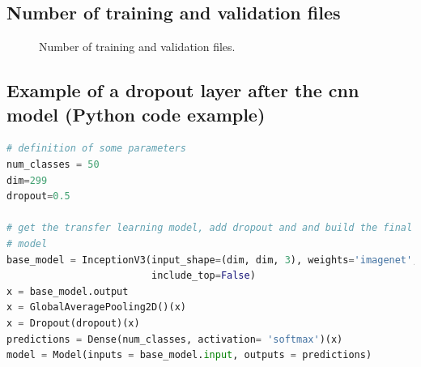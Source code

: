 \documentclass[10pt]{article}
\newcommand\inputpgf[2]{{
\let\pgfimageWithoutPath\pgfimage
\renewcommand{\pgfimage}[2][]{\pgfimageWithoutPath[##1]{#1/##2}}

}}
\begin{document}
		\subsection{Number of training and validation files}
			\begin{figure}[H]
				\begin{center}
					\scalebox{0.75}{
						\inputpgf{images/pgf}{number-of-files.pgf}
					}
				\end{center}
				\vspace*{-20pt}
				\caption[Number of training and validation files]{Number of training and validation files.}
				\label{fig:implementation_number_train_files}
			\end{figure}
			
			
		\clearpage
		\subsection{Example of a dropout layer after the \ac{cnn} model (Python code example)}
			\begin{lstlisting}[frame=single,caption={Example of a dropout layer after the \ac{cnn} model},captionpos=b,basicstyle=\small,language=Python,label=lst:lstlisting_python_dropout]
# definition of some parameters
num_classes = 50
dim=299
dropout=0.5

# get the transfer learning model, add dropout and and build the final
# model
base_model = InceptionV3(input_shape=(dim, dim, 3), weights='imagenet',
                         include_top=False)
x = base_model.output
x = GlobalAveragePooling2D()(x)
x = Dropout(dropout)(x)
predictions = Dense(num_classes, activation= 'softmax')(x)
model = Model(inputs = base_model.input, outputs = predictions)
			\end{lstlisting}
			
			
\end{document}
